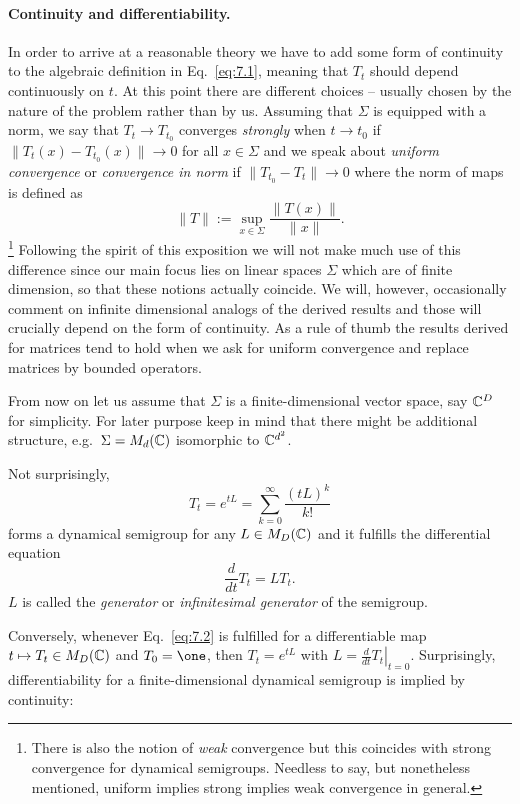 \documentclass[11pt,a4paper]{article}
\theoremstyle{plain}
\begin{document}
\paragraph{Continuity and differentiability.}
In order to arrive at a reasonable theory we have to add some form of continuity to the algebraic definition in Eq.~\eqref{eq:7.1}, meaning that $T_t$ should depend continuously on $t$. At this point there are different choices -- usually chosen by the nature of the problem rather than by us. Assuming that $\Sigma$ is equipped with a norm, we say that $T_t\to T_{t_0}$ converges \emph{strongly} when $t\to t_0$ if $\lVert T_t(x)-T_{t_0}(x)\rVert\to 0$ for all $x\in\Sigma$ and we speak about \emph{uniform convergence} or \emph{convergence in norm} if $\lVert T_{t_0}-T_t\rVert\to 0$ where the norm of maps is defined as
\[
    \lVert T\rVert := \sup_{x\in\Sigma}\frac{\lVert T(x)\rVert}{\lVert x\rVert}.
\]\footnote{There is also the notion of \emph{weak} convergence but this coincides with strong convergence for dynamical semigroups. Needless to say, but nonetheless mentioned, uniform implies strong implies weak convergence in general.}
Following the spirit of this exposition we will not make much use of this difference since our main focus lies on linear spaces $\Sigma$ which are of finite dimension, so that these notions actually coincide. We will, however, occasionally comment on infinite dimensional analogs of the derived results and those will crucially depend on the form of continuity. As a rule of thumb the results derived for matrices tend to hold when we ask for uniform convergence and replace matrices by bounded operators.

From now on let us assume that $\Sigma$ is a finite-dimensional vector space, say $\mathbb{C}^{D}$ for simplicity. For later purpose keep in mind that there might be additional structure, e.g.\ $\Sigma = M_d(\mathbb{C})$ isomorphic to $\mathbb{C}^{d^2}$.

Not surprisingly,
\[
    T_t = e^{tL}=\sum_{k=0}^{\infty}\frac{(tL)^k}{k!}
\]
forms a dynamical semigroup for any $L\in M_D(\mathbb{C})$ and it fulfills the differential equation
\begin{equation}\label{eq:7.2}
    \frac{d}{dt}T_t = LT_t.
\end{equation}
$L$ is called the \emph{generator} or \emph{infinitesimal generator} of the semigroup.

Conversely, whenever Eq.~\eqref{eq:7.2} is fulfilled for a differentiable map $t\mapsto T_t\in M_D(\mathbb{C})$ and $T_0=\one$, then $T_t=e^{tL}$ with $L=\left.\frac{d}{dt}T_t\right|_{t=0}$. Surprisingly, differentiability for a finite-dimensional dynamical semigroup is implied by continuity:
\end{document}
